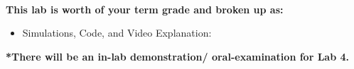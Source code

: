 \vspace{0.5cm}
\\
\textbf{
This lab is worth \laboneisworth{} of your term grade and broken up as:
}
\begin{itemize}
    \item Simulations, Code, and Video Explanation: \laboneisworth
\end{itemize}
\textbf{*There will be an in-lab demonstration/ oral-examination for Lab 4.}